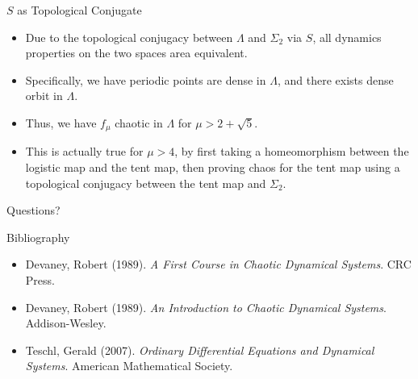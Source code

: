 \documentclass[aspectratio=169]{beamer}
\begin{document}
\begin{frame}{$S$ as Topological Conjugate}
\begin{itemize}
    \item Due to the topological conjugacy between $\Lambda$ and $\Sigma_2$ via $S$, all dynamics properties on the two spaces area equivalent. 
    \item Specifically, we have periodic points are dense in $\Lambda$, and there exists dense orbit in $\Lambda$. 
    \item Thus, we have $f_\mu$ chaotic in $\Lambda$ for $\mu>2+\sqrt5$.
    \item This is actually true for $\mu>4$, by first taking a homeomorphism between the logistic map and the tent map, then proving chaos for the tent map using a topological conjugacy between the tent map and $\Sigma_2$. 
\end{itemize}
\end{frame}

\begin{frame}{}
      \begin{center}
    {\color{sigma@mainblue} \LARGE Questions?}
  \end{center}
\end{frame}

\begin{frame}[allowframebreaks]{Bibliography}
    \tiny
    
    
    \begin{itemize}
        \item Devaney, Robert (1989). \textit{A First Course in Chaotic Dynamical Systems}. CRC Press.
        \item Devaney, Robert (1989). \textit{An Introduction to Chaotic Dynamical Systems}. Addison-Wesley.
        \item Teschl, Gerald (2007). \textit{Ordinary Differential Equations and Dynamical Systems}. American Mathematical Society. 
    \end{itemize}
\end{frame}
\end{document}
